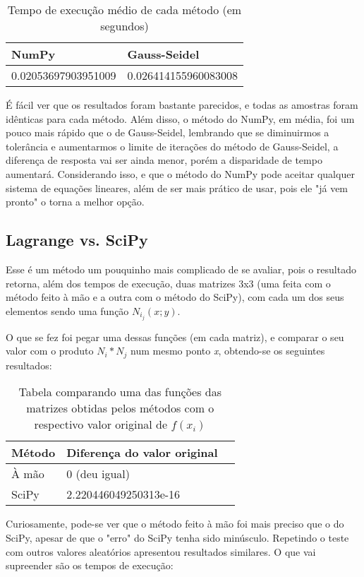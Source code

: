 \documentclass[12pt,A4]{report}
\begin{document}
\begin{table}[htp]
\centering
\begin{tabular}{ll}
NumPy               & Gauss-Seidel         \\
  \hline\hline
0.02053697903951009 & 0.026414155960083008
\end{tabular}
\caption{Tempo de execução médio de cada método (em segundos)}
\end{table}
\newpage
É fácil ver que os resultados foram bastante parecidos, e todas as amostras foram idênticas para cada método. Além disso, o método do NumPy, em média, foi um pouco mais rápido que o de Gauss-Seidel, lembrando que se diminuirmos a tolerância e aumentarmos o limite de iterações do método de Gauss-Seidel, a diferença de resposta vai ser ainda menor, porém a disparidade de tempo aumentará.
Considerando isso, e que o método do NumPy pode aceitar qualquer sistema de equações lineares, além de ser mais prático de usar, pois ele "já vem pronto" o torna a melhor opção. 

\subsection{Lagrange vs. SciPy}
Esse é um método um pouquinho mais complicado de se avaliar, pois o resultado retorna, além dos tempos de execução, duas matrizes 3x3 (uma feita com o método feito à mão e a outra com o método do SciPy), com cada um dos seus elementos sendo uma função $N_i_j(x;y)$.

O que se fez foi pegar uma dessas funções (em cada matriz), e comparar o seu valor com o produto $N_i * N_j$ num mesmo ponto \textit{x}, obtendo-se os seguintes resultados:
\begin{table}[htp]
\centering
\begin{tabular}{lll}
Método & Diferença do valor original \\
\hline\hline
À mão  & 0 (deu igual)               \\
SciPy  & 2.220446049250313e-16     
\end{tabular}
\caption{Tabela comparando uma das funções das matrizes obtidas pelos métodos com o respectivo valor original de $f(x_i)$}
\end{table}

Curiosamente, pode-se ver que o método feito à mão foi mais preciso que o do SciPy, apesar de que o "erro" do SciPy tenha sido minúsculo. Repetindo o teste com outros valores aleatórios apresentou resultados similares. O que vai supreender são os tempos de execução:
\end{document}
